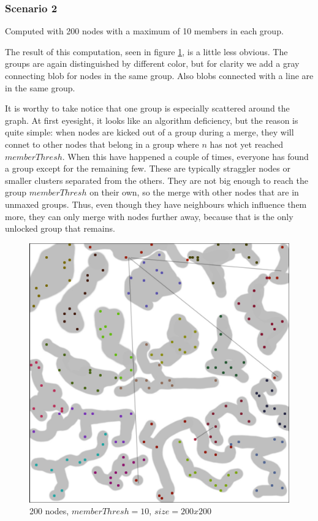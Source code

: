 \subsubsection{Scenario 2} \label{scen2}
Computed with 200 nodes with a maximum of 10 members in each group.

The result of this computation, seen in figure \ref{fig:200_10}, is a little less obvious.
The groups are again distinguished by different color, but for clarity we add a gray connecting
blob for nodes in the same group. Also blobs connected with a line are in the same group. 

It is worthy to take notice that one group is especially scattered around the graph.
At first eyesight, it looks like an algorithm deficiency, but the reason is quite simple:
when nodes are kicked out of a group during a merge, they will connet to other nodes
that belong in a group where $n$ has not yet reached $memberThresh$. When this have happened a couple of times, everyone has found a group except for the remaining few.
These are typically straggler nodes or smaller clusters separated from the others.
They are not big enough to reach the group $memberThresh$ on their own, so the merge with other
nodes that are in unmaxed groups. Thus, even though they have neighbours which
influence them more, they can only merge with nodes further away,
because that is the only unlocked group that remains.
\begin{figure}
\center
\includegraphics[scale=0.45]{Images/grouptest_2.jpg}
\caption{200 nodes, $memberThresh=10$, $size=200x200$}
\label{fig:200_10}
\end{figure}

